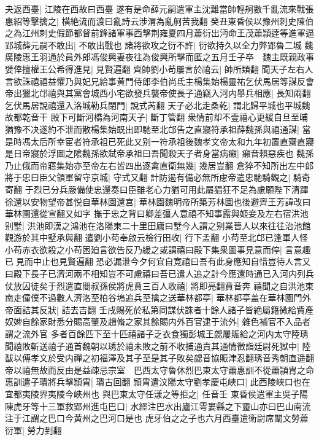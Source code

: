 夬返西臺|{
	江陵在西故曰西臺}
遂有是命薛元嗣遣軍主沈難當帥輕舸數千亂流來戰張惠紹等擊擒之|{
	横絶流而渡曰亂詩云涉渭為亂舸苦我翻}
癸丑東昏侯以豫州刺史陳伯之為江州刺史假節都督前鋒諸軍事西擊荆雍夏四月蕭衍出沔命王茂蕭頴逹等進軍逼郢城薛元嗣不敢出|{
	不敢出戰也}
諸將欲攻之衍不許|{
	衍欲持久以全力弊郢魯二城}
魏廣陵惠王羽通於員外郎馮俊興妻夜往為俊興所擊而匿之五月壬子卒　魏主既親政事嬖倖擅權王公希得進見|{
	見賢遍翻}
齊帥劉小苟屢言於禧云|{
	帥所類翻}
聞天子左右人言欲誅禧禧益懼乃與妃兄給事黄門侍郎李伯尚氐主楊集始楊靈祐乞伏馬居等謀反會帝出獵北邙禧與其黨會城西小宅欲發兵襲帝使長子通竊入河内舉兵相應|{
	長知兩翻}
乞伏馬居說禧還入洛城勒兵閉門|{
	說式芮翻}
天子必北走桑乾|{
	謂北歸平城也平城魏故都乾音干}
殿下可斷河橋為河南天子|{
	斷丁管翻}
衆情前却不壹禧心更緩自旦至晡猶豫不决遂約不泄而散楊集始既出即馳至北邙告之直寢符承祖薛魏孫與禧通謀|{
	當是時馮太后所幸宦者符承祖已死此又别一符承祖後魏孝文帝太和九年初置直齋直寢}
是日帝寢於浮圖之隂魏孫欲弑帝承祖曰吾聞殺天子者身當病癩|{
	癩音賴惡疾也}
魏孫乃止俄而帝寤集始亦至帝左右皆四出逐禽直衛無幾|{
	幾居豈翻}
倉猝不知所出左中郎將于忠曰臣父領軍留守京城|{
	守式又翻}
計防遏有備必無所慮帝遣忠馳騎觀之|{
	騎奇寄翻}
于烈已分兵嚴備使忠還奏曰臣雖老心力猶可用此屬猖狂不足為慮願陛下清蹕徐還以安物望帝甚悦自華林園還宫|{
	華林園魏明帝所築芳林園也後避齊王芳諱改曰華林園還從宣翻又如字}
撫于忠之背曰卿差彊人意禧不知事露與姬妾及左右宿洪池别墅|{
	洪池即漢之鴻池在洛陽東二十里田廬曰墅今人謂之别業晉人以來往往治池館觀游於其中墅承與翻}
遣劉小苟奉啟云檢行田收|{
	行下孟翻}
小苟至北邙已逢軍人怪小苟赤衣欲殺之小苟困廹言欲告反乃緩之或謂禧曰殿下集衆圖事見意而停|{
	言意趣已見而中止也見賢遍翻}
恐必漏泄今夕何宜自寛禧曰吾有此身應知自惜豈待人言又曰殿下長子已濟河兩不相知豈不可慮禧曰吾已遣人追之計今應還時通已入河内列兵仗放囚徒矣于烈遣直閤叔孫侯將虎賁三百人收禧|{
	將即亮翻賁音奔}
禧聞之自洪池東南走僮僕不過數人濟洛至柏谷塢追兵至擒之送華林都亭|{
	華林都亭盖在華林園門外}
帝面詰其反狀|{
	詰去吉翻}
壬戌賜死於私第同謀伏誅者十餘人諸子皆絶屬籍微給貲產奴婢自餘家財悉分賜高肇及趙脩之家其餘賜内外百官逮于流外|{
	雜色補官不入品者謂之流外官}
多者百餘匹下至十匹禧諸子乏衣食獨彭城王勰屢賑給之河内太守陸琇聞禧敗斬送禧子通首魏朝以琇於禧未敗之前不收捕通責其通情徵詣廷尉死獄中|{
	陸馛以傅孝文於受内禪之初福澤及其子至是其子敗矣勰音協賑津忍翻琇音秀朝直遥翻}
帝以禧無故而反由是益疎忌宗室　巴西太守魯休烈巴東太守蕭惠訓不從蕭頴胄之命惠訓遣子璝將兵擊頴胄|{
	璝古回翻}
頴胄遣汶陽太守劉孝慶屯峽口|{
	此西陵峽口也在宜都夷陵界夷陵今峽州也}
與巴東太守任漾之等拒之|{
	任音壬}
東昏侯遣軍主吳子陽陳虎牙等十三軍救郢州進屯巴口|{
	水經注巴水出廬江雩婁縣之下靈山亦曰巴山南流注于江謂之巴口今黄州之巴河口是也}
虎牙伯之之子也六月西臺遣衛尉席闡文勞蕭衍軍|{
	勞力到翻}
